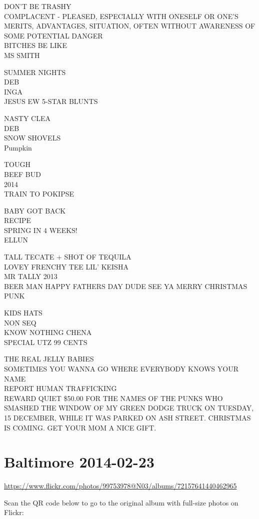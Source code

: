 \documentclass[10pt,letterpaper]{article}
\begin{document}
DON'T BE TRASHY\\
COMPLACENT {-} PLEASED, ESPECIALLY WITH ONESELF OR ONE'S MERITS, ADVANTAGES, SITUATION, OFTEN WITHOUT AWARENESS OF SOME POTENTIAL DANGER\\
BITCHES BE LIKE\\
MS SMITH

SUMMER NIGHTS\\
DEB\\
INGA\\
JESUS EW 5{-}STAR BLUNTS

NASTY CLEA\\
DEB\\
SNOW SHOVELS\\
Pumpkin

TOUGH\\
BEEF BUD\\
2014\\
TRAIN TO POKIPSE

BABY GOT BACK\\
RECIPE\\
SPRING IN 4 WEEKS!\\
ELLUN

TALL TECATE + SHOT OF TEQUILA\\
LOVEY FRENCHY TEE LIL' KEISHA\\
MR TALLY 2013\\
BEER MAN HAPPY FATHERS DAY DUDE SEE YA MERRY CHRISTMAS PUNK

KIDS HATS\\
NON SEQ\\
KNOW NOTHING CHENA\\
SPECIAL UTZ 99 CENTS

THE REAL JELLY BABIES\\
SOMETIMES YOU WANNA GO WHERE EVERYBODY KNOWS YOUR NAME\\
REPORT HUMAN TRAFFICKING\\
REWARD QUIET \$50.00 FOR THE NAMES OF THE PUNKS WHO SMASHED THE WINDOW OF MY GREEN DODGE TRUCK ON TUESDAY, 15 DECEMBER, WHILE IT WAS PARKED ON ASH STREET.  CHRISTMAS IS COMING.  GET YOUR MOM A NICE GIFT.


\section*{Baltimore 2014-02-23}

\url{https://www.flickr.com/photos/99753978@N03/albums/72157641440462965}

Scan the QR code below to go to the original album with full-size photos on Flickr:
\end{document}
